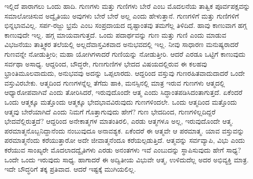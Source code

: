 ಇಲ್ಲಿದೆ ಪಾರಾಗಲು ಒಂದು ಹಾದಿ. ಗುಣಗಳು ಮತ್ತು ಗುಣಿಗಳು ಬೇರೆ ಎಂಬ ಮೊದಲನೆಯ ತಾತ್ವಿಕ ಪೂರ್ವಪಕ್ಷವನ್ನು ಸಮಾಲೋಚಿಸುವ ಅದ್ವೈತಿಯು ಅವುಗಳು ಬೇರೆ ಬೇರೆ ಅಲ್ಲ ಎಂದು ಹೇಳುತ್ತಾನೆ. ಗುಣಗಳಿಗೆ ಮತ್ತು ಗುಣಿಗಳಿಗೆ ಭಿನ್ನಭಾವವಿಲ್ಲ. ಸರ್ಪ-ರಜ್ಜು ಭ್ರಮೆ ಎಂಬ ಸಂಪ್ರದಾಯದ ದೃಷ್ಟಾಂತವು ತಮಗೆಲ್ಲ ತಿಳಿದಿದೆ. ಹಾವು ಕಾಣುವಾಗ ಹಗ್ಗ ಕಾಣುವುದೇ ಇಲ್ಲ. ಹಗ್ಗ ಮಾಯವಾಗುತ್ತದೆ. ಒಂದು ಪದಾರ್ಥವನ್ನು ಗುಣ ಮತ್ತು ಗುಣಿ ಎಂದು ಮಾಡುವ ವಿಭಜನೆಯು ತಾತ್ತ್ವಿಕರ ತಲೆಯಲ್ಲಿ ಅಲ್ಲದೆ\break ವಾಸ್ತವಿಕವಾದ ಅನುಭವದಲ್ಲಿ ಇಲ್ಲ. ನೀವು ಸಾಧಾರಣ ಮನುಷ್ಯರಾದರೆ ಗುಣವನ್ನೇ ನೋಡುತ್ತೀರಿ; ಮಹಾ ಯೋಗಿಗಳಾದರೆ ಗುಣಿಯನ್ನು ನೋಡುತ್ತೀರಿ. ಆದರೆ ಎರಡೂ ಒಟ್ಟಿಗೆ ಕಾಣುವುದು ಸರ್ವಥಾ ಅಸಾಧ್ಯ. ಆದ್ದರಿಂದ, ಬೌದ್ಧರೇ, ಗುಣಗುಣಿಗಳ ಭೇದದ ವಿಷಯದಲ್ಲಿರುವ ಈ ಕಲಹವು ಭ್ರಾಂತಿಮೂಲವಾದುದು, ಅನುಭವವು ಅದನ್ನು ಒಪ್ಪಲಾರದು. ಆದ್ದರಿಂದ ವಸ್ತುವು ಗುಣರಹಿತವಾದುದಾದರೆ ಒಂದೇ ವಸ್ತುವಿರಬೇಕು. ಆತ್ಮದಿಂದ ಗುಣಗಳನ್ನೆಲ್ಲ ತೆಗೆದು ಹಾಕಿ, ಮನಸ್ಸಿನಲ್ಲಿ ಮಾತ್ರ ಇರುವ ಗುಣಗಳು ಆತ್ಮದಲ್ಲಿ ಆಧ್ಯಾರೋಪವಾಗಿವೆ ಎಂದು ತೋರಿಸಿದರೆ, ಇರುವುದೊಂದೇ ಆತ್ಮ ಎಂದು ಸಿದ್ಧಾಂತಪಡಿಸಿದಂತಾಗುತ್ತದೆ. ಏಕೆಂದರೆ ಒಂದು ಆತ್ಮಕ್ಕೂ ಮತ್ತೊಂದು ಆತ್ಮಕ್ಕೂ ಭೇದಭಾವವಿರುವುದು ಗುಣಗಳಿಂದಲೇ. ಒಂದು ಆತ್ಮದಿಂದ ಮತ್ತೊಂದು ಆತ್ಮವು ಬೇರೆಯಾಗಿದೆ ಎಂದು ನಿಮಗೆ ಗೊತ್ತಾಗುವುದು ಹೇಗೆ? ಗುಣ ಭೇದದಿಂದ, ಗುಣಗಳಿಲ್ಲದಿದ್ದರೆ ಭೇದವೆಲ್ಲಿರುತ್ತದೆ? ಆದ್ದರಿಂದ ಅನೇಕಾತ್ಮಗಳ ಮಾತಂತಿರಲಿ, ಎರಡು ಆತ್ಮಗಳೂ ಅಲ್ಲ, ಇರುವುದೊಂದೇ ಆತ್ಮ. ಪರಮಾತ್ಮನೊಬ್ಬನಿದ್ದಾನೆಂದು ನಂಬುವುದೂ ಅನಾವಶ್ಯಕ. ಏಕೆಂದರೆ ಈ ಆತ್ಮವೇ ಆ ಪರಮಾತ್ಮ. ಯಾವ ವಸ್ತುವನ್ನು ಪರಮಾತ್ಮನೆಂದು ಕರೆಯುತ್ತಾರೋ ಅದೇ ಜೀವಾತ್ಮನೆಂದೂ ಕರೆಯಲ್ಪಡುತ್ತಿದೆ. ಆತ್ಮವನ್ನು ಸರ್ವವ್ಯಾಪಿ, ವಿಭು ಎಂದು ಕರೆಯುವ ಸಾಂಖ್ಯರೇ ಮೊದಲಾದ\break ದ್ವೈತಿಗಳು ಎರಡು ಅನಂತಗಳು ಇವೆ ಎಂಬುದನ್ನು ಸ್ಥಾಪಿಸುವುದು ಹೇಗೆ ಸಾಧ್ಯ? ಒಂದೇ ಒಂದು ಇರುವುದು ಸಾಧ್ಯ. ಹಾಗಾದರೆ ಈ ಅದ್ವಿತೀಯ ವಿಭುವೇ ಆತ್ಮ, ಉಳಿದುದೆಲ್ಲ ಅದರ ಅಭಿವ್ಯಕ್ತಿ ಮಾತ್ರ. ಇದೇ ಬೌದ್ಧರಿಗೆ ತಕ್ಕ ಪ್ರತಿವಾದ. ಆದರೆ ಇಷ್ಟಕ್ಕೆ ಮುಗಿಯಲಿಲ್ಲ.

